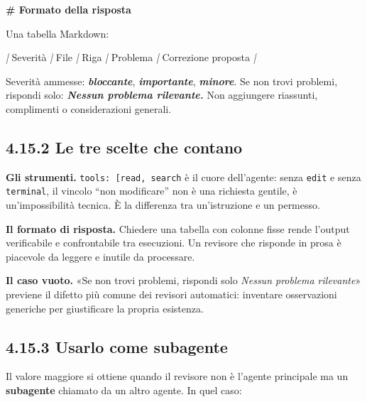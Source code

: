 \documentclass[
  italian,
  10pt,
]{book}
\newenvironment{Shaded}{\begin{snugshade}}{\end{snugshade}}
\newcommand{\FunctionTok}[1]{\textcolor[rgb]{0.13,0.29,0.53}{\textbf{#1}}}
\newcommand{\InformationTok}[1]{\textcolor[rgb]{0.56,0.35,0.01}{\textbf{\textit{#1}}}}
\newcommand{\NormalTok}[1]{#1}
\newcommand{\PreprocessorTok}[1]{\textcolor[rgb]{0.56,0.35,0.01}{\textit{#1}}}
\begin{document}
\begin{Shaded}
\begin{Highlighting}[]
\FunctionTok{\# Formato della risposta}

\NormalTok{Una tabella Markdown:}

\PreprocessorTok{|}\NormalTok{ Severità }\PreprocessorTok{|}\NormalTok{ File }\PreprocessorTok{|}\NormalTok{ Riga }\PreprocessorTok{|}\NormalTok{ Problema }\PreprocessorTok{|}\NormalTok{ Correzione proposta }\PreprocessorTok{|}

\NormalTok{Severità ammesse: }\InformationTok{\textasciigrave{}bloccante\textasciigrave{}}\NormalTok{, }\InformationTok{\textasciigrave{}importante\textasciigrave{}}\NormalTok{, }\InformationTok{\textasciigrave{}minore\textasciigrave{}}\NormalTok{.}
\NormalTok{Se non trovi problemi, rispondi solo: }\InformationTok{\textasciigrave{}Nessun problema rilevante.\textasciigrave{}}
\NormalTok{Non aggiungere riassunti, complimenti o considerazioni generali.}
\end{Highlighting}
\end{Shaded}

\subsection{4.15.2 Le tre scelte che
contano}\label{le-tre-scelte-che-contano}

\textbf{Gli strumenti.}
\texttt{tools:\ {[}\textquotesingle{}read\textquotesingle{},\ \textquotesingle{}search\textquotesingle{}{]}}
è il cuore dell'agente: senza \texttt{edit} e senza \texttt{terminal},
il vincolo ``non modificare'' non è una richiesta gentile, è
un'impossibilità tecnica. È la differenza tra un'istruzione e un
permesso.

\textbf{Il formato di risposta.} Chiedere una tabella con colonne fisse
rende l'output verificabile e confrontabile tra esecuzioni. Un revisore
che risponde in prosa è piacevole da leggere e inutile da processare.

\textbf{Il caso vuoto.} «Se non trovi problemi, rispondi solo
\emph{Nessun problema rilevante}» previene il difetto più comune dei
revisori automatici: inventare osservazioni generiche per giustificare
la propria esistenza.

\subsection{4.15.3 Usarlo come subagente}\label{usarlo-come-subagente}

Il valore maggiore si ottiene quando il revisore non è l'agente
principale ma un \textbf{subagente} chiamato da un altro agente. In quel
caso:
\end{document}
